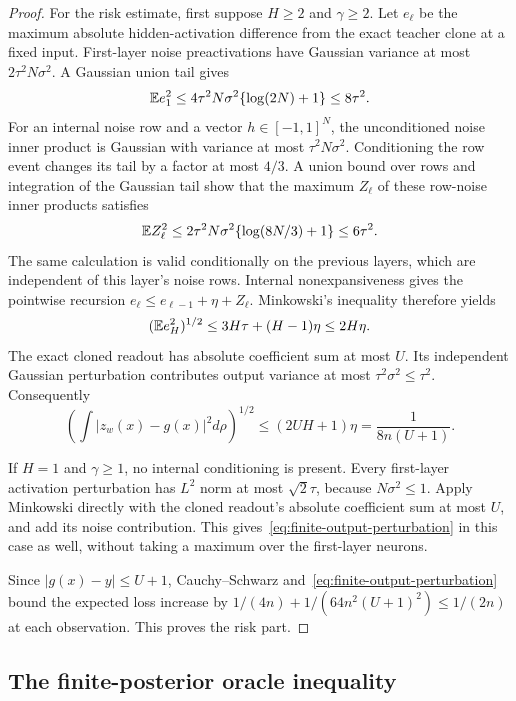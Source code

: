 \begin{proof}
For the risk estimate, first suppose $H\geq2$ and $\gamma\geq2$. Let $e_\ell$ be the maximum absolute hidden-activation difference from the exact teacher clone at a fixed input. First-layer noise preactivations have Gaussian variance at most $2\tau^2N\sigma^2$. A Gaussian union tail gives
\[
 \mathbb E e_1^2\leq4\tau^2N\sigma^2\{\log(2N)+1\}\leq8\tau^2.
\]
For an internal noise row and a vector $h\in[-1,1]^N$, the unconditioned noise inner product is Gaussian with variance at most $\tau^2N\sigma^2$. Conditioning the row event changes its tail by a factor at most $4/3$. A union bound over rows and integration of the Gaussian tail show that the maximum $Z_\ell$ of these row-noise inner products satisfies
\[
 \mathbb E Z_\ell^2
 \leq2\tau^2N\sigma^2\{\log(8N/3)+1\}\leq6\tau^2.
\]
The same calculation is valid conditionally on the previous layers, which are independent of this layer's noise rows. Internal nonexpansiveness gives the pointwise recursion
$e_\ell\leq e_{\ell-1}+\eta+Z_\ell$. Minkowski's inequality therefore yields
\[
 (\mathbb E e_H^2)^{1/2}\leq3H\tau+(H-1)\eta\leq2H\eta.
\]
The exact cloned readout has absolute coefficient sum at most $U$. Its independent Gaussian perturbation contributes output variance at most $\tau^2\sigma^2\leq\tau^2$. Consequently
\begin{equation}
 \left(\int|z_w(x)-g(x)|^2d\rho\right)^{1/2}
 \leq(2UH+1)\eta=\frac1{8n(U+1)}.
 \label{eq:finite-output-perturbation}
\end{equation}

If $H=1$ and $\gamma\geq1$, no internal conditioning is present. Every first-layer activation perturbation has $L^2$ norm at most $\sqrt2\tau$, because $N\sigma^2\leq1$. Apply Minkowski directly with the cloned readout's absolute coefficient sum at most $U$, and add its noise contribution. This gives~\eqref{eq:finite-output-perturbation} in this case as well, without taking a maximum over the first-layer neurons.

Since $|g(x)-y|\leq U+1$, Cauchy--Schwarz and~\eqref{eq:finite-output-perturbation} bound the expected loss increase by
$1/(4n)+1/(64n^2(U+1)^2)\leq1/(2n)$ at each observation. This proves the risk part.
\end{proof}

\subsection{The finite-posterior oracle inequality}

